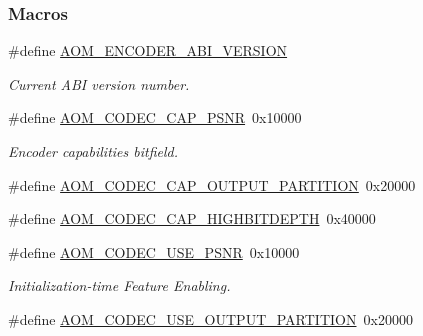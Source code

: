 \subsubsection*{Macros}
\begin{DoxyCompactItemize}
\item 
\#define \hyperlink{group__encoder_gae4af664f2049d5b7d7b644d9a61d497c}{A\+O\+M\+\_\+\+E\+N\+C\+O\+D\+E\+R\+\_\+\+A\+B\+I\+\_\+\+V\+E\+R\+S\+I\+ON}\hypertarget{group__encoder_gae4af664f2049d5b7d7b644d9a61d497c}{}\label{group__encoder_gae4af664f2049d5b7d7b644d9a61d497c}

\begin{DoxyCompactList}\small\item\em Current A\+BI version number. \end{DoxyCompactList}\item 
\#define \hyperlink{group__encoder_gaaf72058c11fcf006c41662114997e12c}{A\+O\+M\+\_\+\+C\+O\+D\+E\+C\+\_\+\+C\+A\+P\+\_\+\+P\+S\+NR}~0x10000
\begin{DoxyCompactList}\small\item\em Encoder capabilities bitfield. \end{DoxyCompactList}\item 
\#define \hyperlink{group__encoder_gaffe0534e52a635dab200dad2456b9336}{A\+O\+M\+\_\+\+C\+O\+D\+E\+C\+\_\+\+C\+A\+P\+\_\+\+O\+U\+T\+P\+U\+T\+\_\+\+P\+A\+R\+T\+I\+T\+I\+ON}~0x20000
\item 
\#define \hyperlink{group__encoder_ga608725216f15096fa209d30fef121c1c}{A\+O\+M\+\_\+\+C\+O\+D\+E\+C\+\_\+\+C\+A\+P\+\_\+\+H\+I\+G\+H\+B\+I\+T\+D\+E\+P\+TH}~0x40000
\item 
\#define \hyperlink{group__encoder_gae722c9f9ba9b4ca8dba6bbe7c0692024}{A\+O\+M\+\_\+\+C\+O\+D\+E\+C\+\_\+\+U\+S\+E\+\_\+\+P\+S\+NR}~0x10000
\begin{DoxyCompactList}\small\item\em Initialization-\/time Feature Enabling. \end{DoxyCompactList}\item 
\#define \hyperlink{group__encoder_gadb4a188ee79fd79fc5f2f1ae8df69826}{A\+O\+M\+\_\+\+C\+O\+D\+E\+C\+\_\+\+U\+S\+E\+\_\+\+O\+U\+T\+P\+U\+T\+\_\+\+P\+A\+R\+T\+I\+T\+I\+ON}~0x20000\hypertarget{group__encoder_gadb4a188ee79fd79fc5f2f1ae8df69826}{}\label{group__encoder_gadb4a188ee79fd79fc5f2f1ae8df69826}


\end{DoxyCompactItemize}
